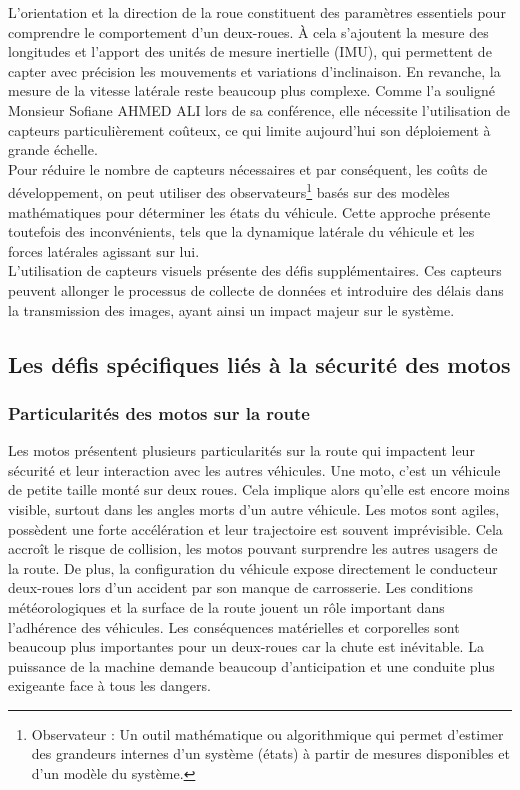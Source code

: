 L’orientation et la direction de la roue constituent des paramètres essentiels pour comprendre le comportement d’un deux-roues. À cela s’ajoutent la mesure des longitudes et l’apport des unités de mesure inertielle (IMU), qui permettent de capter avec précision les mouvements et variations d’inclinaison. En revanche, la mesure de la vitesse latérale reste beaucoup plus complexe. Comme l’a souligné Monsieur Sofiane AHMED ALI lors de sa conférence\cite{ahmed_ali_synthese_2024}, elle nécessite l’utilisation de capteurs particulièrement coûteux, ce qui limite aujourd’hui son déploiement à grande échelle.\\
Pour réduire le nombre de capteurs nécessaires et par conséquent, les coûts de développement, on peut utiliser des observateurs\footnote{Observateur : Un outil mathématique ou algorithmique qui permet d’estimer des grandeurs internes d’un système (états) à partir de mesures disponibles et d’un modèle du système.} basés sur des modèles mathématiques pour déterminer les états du véhicule. Cette approche présente toutefois des inconvénients, tels que la dynamique latérale du véhicule et les forces latérales agissant sur lui.\\
L'utilisation de capteurs visuels présente des défis supplémentaires. Ces capteurs peuvent allonger le processus de collecte de données et introduire des délais dans la transmission des images, ayant ainsi un impact majeur sur le système.


\newpage
\subsection{Les défis spécifiques liés à la sécurité des motos}

\subsubsection{Particularités des motos sur la route}
Les motos présentent plusieurs particularités sur la route qui impactent leur sécurité et leur interaction avec les autres véhicules.
Une moto, c'est un véhicule de petite taille monté sur deux roues. Cela implique alors qu'elle est encore moins visible, surtout dans les angles morts d'un autre véhicule. Les motos sont agiles, possèdent une forte accélération et leur trajectoire est souvent imprévisible.  Cela accroît le risque de collision, les motos pouvant surprendre les autres usagers de la route. De plus, la configuration du véhicule expose directement le conducteur deux-roues lors d'un accident par son manque de carrosserie. Les conditions météorologiques et la surface de la route jouent un rôle important dans l'adhérence des véhicules. Les conséquences matérielles et corporelles sont beaucoup plus importantes pour un deux-roues car la chute est inévitable.
La puissance de la machine demande beaucoup d'anticipation et une conduite plus exigeante face à tous les dangers.\\

